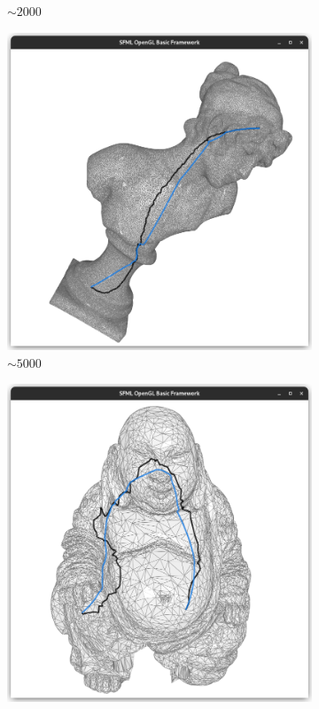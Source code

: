 \documentclass{stdlocal}
\begin{document}
\begin{figure}
\begin{subfigure}[b]{0.24\linewidth}
    \caption{$\sim 2000$}
  \end{subfigure}
  \begin{subfigure}[b]{0.24\linewidth}
    \centering
    \includegraphics[width=\linewidth,trim={15px 20 15 50},clip]{images/sappho-geodesic-1.png}
    \caption{$\sim 5000$}
  \end{subfigure}
  \begin{subfigure}[b]{0.24\linewidth}
    \centering
    \includegraphics[width=\linewidth,trim={15px 20 15 50},clip]{images/buddha-geodesic-1.png}

\end{subfigure}
\end{figure}
\end{document}
